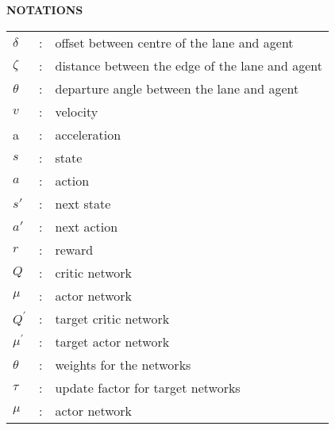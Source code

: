 \begin{center}
\Large{\textbf{NOTATIONS}}\\
\end{center}
\begin{table}[bpht!]
\centering
\begin{tabular}{lcl}
$\delta$&:&offset between centre of the lane and agent\\
$\zeta$&:& distance between the edge of the lane and agent\\
$\theta$&:& departure angle between the lane and  agent\\
$v $&:& velocity\\
a &:& acceleration\\
$s $&:& state\\
$a $&:& action\\
$s' $&:& next state\\
$a' $&:& next action\\
$r $&:& reward\\
$Q $&:& critic network\\
$\mu $&:& actor network\\
$Q^{'} $&:& target critic network\\
$\mu^{'} $&:& target actor network\\
$\theta $&:& weights for the networks\\
$\tau $&:& update factor for target networks\\
$\mu $&:& actor network\\


\end{tabular}
\end{table}